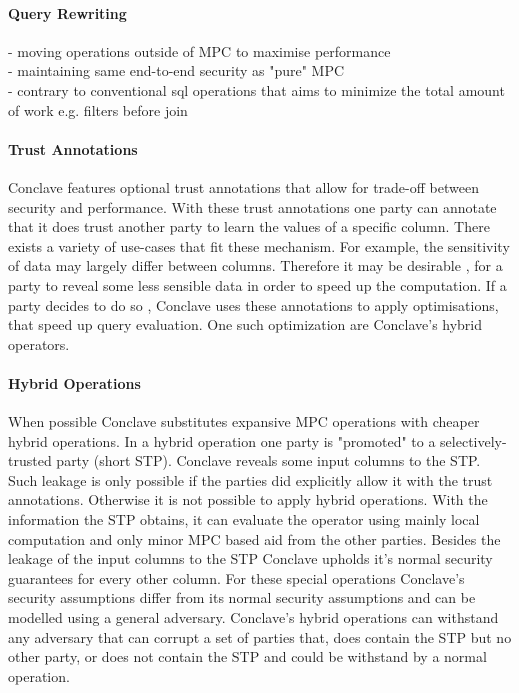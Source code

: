 \paragraph{Query Rewriting}
- moving operations outside of MPC to maximise performance\\
- maintaining same end-to-end security as "pure" MPC     \\
- contrary to conventional sql operations that aims to minimize the total amount of work e.g. filters before join \\

\label{Trust_label}	
\paragraph{Trust Annotations}
Conclave features optional trust annotations that allow for trade-off between security and performance. With these trust annotations one party can annotate that it does trust another party to learn the values of a specific column. There exists a variety of use-cases that fit these mechanism. For example, the sensitivity of data may largely differ between columns. Therefore it may be desirable , for a party to reveal some less sensible data in order to speed up the computation. If a party decides to do so , Conclave uses these annotations to apply optimisations, that speed up query evaluation. One such optimization are Conclave's hybrid operators.
\paragraph{Hybrid Operations}
When possible Conclave substitutes expansive MPC operations with cheaper hybrid operations. In a hybrid operation one party is "promoted" to a selectively-trusted party (short STP). Conclave reveals some input columns to the STP. Such leakage is only possible if the parties did explicitly allow it with the trust annotations. Otherwise it is not possible to apply hybrid operations. With the information the STP obtains, it can evaluate the operator using mainly local computation and only minor MPC based aid from the other parties. Besides the leakage of the input columns to the STP Conclave upholds it's normal security guarantees for every other column. For these special operations Conclave's security assumptions differ from its normal security assumptions and can be modelled using a general adversary. Conclave's hybrid operations can withstand any adversary that can corrupt a set of parties that, does contain the STP but no other party, or does not contain the STP and could be withstand by a normal operation. 
